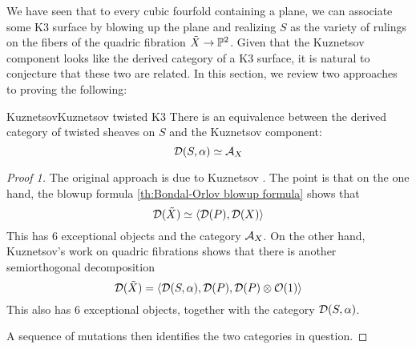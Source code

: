 We have seen that to every cubic fourfold containing a plane, we can associate some K3 surface by blowing up the plane and realizing $S$ as the variety of rulings on the fibers of the quadric fibration $\tilde{X}\rightarrow \P^2$. Given that the Kuznetsov component looks like the derived category of a K3 surface, it is natural to conjecture that these two are related. In this section, we review two approaches to proving the following: 
\begin{proposition}{Kuznetsov}{Kuznetsov twisted K3}
    There is an equivalence between the derived category of twisted sheaves on $S$ and the Kuznetsov component: $$\calD(S,\alpha)\simeq \calA_X$$
\end{proposition}

\begin{proof}[Proof 1]
    The original approach is due to Kuznetsov \cite{KuznetsovDerivedCubic}. The point is that on the one hand, the blowup formula \ref{th:Bondal-Orlov blowup formula} shows that $$\calD(\tilde{X})\simeq \langle \calD(P), \calD(X)  \rangle $$
    This has $6$ exceptional objects and the category $\calA_X$.
    On the other hand, Kuznetsov's work on quadric fibrations shows that there is another semiorthogonal decomposition $$\calD(\tilde{X})=\langle \calD(S,\alpha), \calD(P), \calD(P) \otimes \O(1)\rangle$$
    This also has $6$ exceptional objects, together with the category $\calD(S,\alpha)$.

    A sequence of mutations then identifies the two categories in question.
\end{proof}

